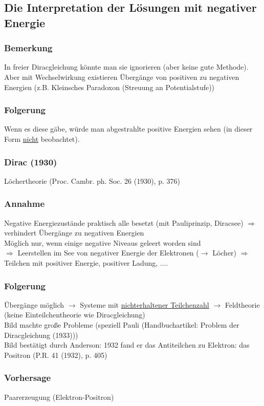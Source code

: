 \documentclass[twoside,a4paper]{scrartcl}
\renewcommand{\1}{\mathds{1}}
\newcommand{\Ra}{\Rightarrow}
\newcommand{\ra}{\rightarrow}
\begin{document}
\subsection{Die Interpretation der Lösungen mit negativer Energie}
\subsubsection*{Bemerkung}
In freier Diracgleichung könnte man sie ignorieren (aber keine gute Methode).\\
 Aber mit Wechselwirkung existieren Übergänge von positiven zu negativen Energien (z.B. Kleinsches Paradoxon (Streuung an Potentialstufe))
\subsubsection*{Folgerung}
Wenn es diese gäbe, würde man abgestrahlte positive Energien sehen (in dieser Form \underline{nicht} beobachtet).
\subsubsection*{Dirac (1930)}
Löchertheorie (Proc. Cambr. ph. Soc. 26 (1930), p. 376)
\subsubsection*{Annahme}
Negative Energiezustände praktisch alle besetzt (mit Pauliprinzip, Diracsee) $\Ra$ verhindert Übergänge zu negativen Energien\\
Möglich nur, wenn einige negative Niveaus geleert worden sind \\
$\Ra$ Leerstellen im See von negativer Energie der Elektronen ($\ra$ Löcher) $\Ra$ Teilchen mit positiver Energie, positiver Ladung, ....
\subsubsection*{Folgerung}
Übergänge möglich $\ra$ Systeme mit \underline{nichterhaltener Teilchenzahl} $\ra$ Feldtheorie (keine Einteilchentheorie wie Diracgleichung)\\
Bild machte große Probleme (speziell Pauli (Handbuchartikel: Problem der Diracgleichung (1933)))\\
Bild bestätigt durch Anderson: 1932 fand er das Antiteilchen zu Elektron: das Positron (P.R. 41 (1932), p. 405)
\subsubsection*{Vorhersage}
Paarerzeugung (Elektron-Positron)
\end{document}

